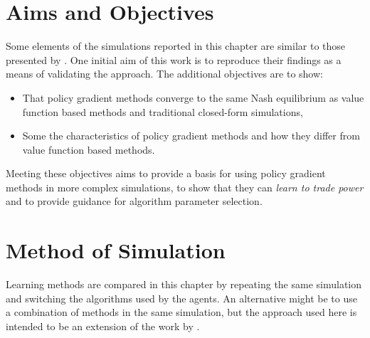 \section{Aims and Objectives}
Some elements of the simulations reported in this chapter are similar to those
presented by .  One initial aim of this work is to
reproduce their findings as a means of validating the approach.  The additional
objectives are to show:
\begin{itemize}
  \item That policy gradient methods converge to the same Nash equilibrium as
  value function based methods and traditional closed-form simulations,
  \item Some the characteristics of policy gradient methods and how they differ
  from value function based methods.
\end{itemize}
Meeting these objectives aims to provide a basis for using policy gradient
methods in more complex simulations, to show that they can \textit{learn to
trade power} and to provide guidance for algorithm parameter selection.

\section{Method of Simulation}
Learning methods are compared in this chapter by repeating the same
simulation and switching the algorithms used by the agents.  An alternative
might be to use a combination of methods in the same simulation, but the
approach used here is intended to be an extension of the work by
.

